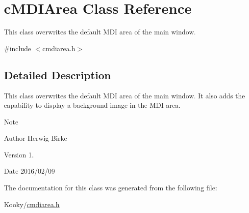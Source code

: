\hypertarget{classc_m_d_i_area}{}\section{c\+M\+D\+I\+Area Class Reference}
\label{classc_m_d_i_area}


This class overwrites the default M\+DI area of the main window.  




{\ttfamily \#include $<$cmdiarea.\+h$>$}



\subsection{Detailed Description}
This class overwrites the default M\+DI area of the main window. It also adds the capability to display a background image in the M\+DI area.

\begin{DoxyNote}{Note}

\end{DoxyNote}
\begin{DoxyAuthor}{Author}
Herwig Birke
\end{DoxyAuthor}
\begin{DoxyVersion}{Version}
1.
\end{DoxyVersion}
\begin{DoxyDate}{Date}
2016/02/09 
\end{DoxyDate}


The documentation for this class was generated from the following file\+:\begin{DoxyCompactItemize}
\item 
Kooky/\hyperlink{cmdiarea_8h}{cmdiarea.\+h}\end{DoxyCompactItemize}
